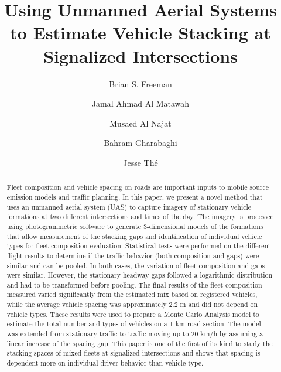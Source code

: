 \documentclass[preprint,12pt,a4paper]{elsarticle}
\title{Using Unmanned Aerial Systems to Estimate Vehicle Stacking at Signalized Intersections}
\begin{document}
\maketitle

\begin{linenumbers}
\begin{frontmatter}

\author[add1]{Brian S. Freeman }

\author[add2]{Jamal Ahmad Al Matawah}

\author[add3]{Musaed Al Najat}

\author[add1]{Bahram Gharabaghi}

\author[add1,add4]{Jesse Th\'e }


\address[add1]{School of Engineering, University of Guelph, Guelph, Ontario, N1G 2W1, Canada}
\address[add2]{Civil Engineering Department, College of Technological Studies, Public Authority for Applied Education and Training, Shuwaikh, Kuwait}
\address[add3]{Kuwait Traffic Safety Society, Shuwaikh, Kuwait}
\address[add4]{Lakes Environmental, 170 Columbia St W, Waterloo, Ontario, N2L 3L3 Canada}


\begin{abstract}
Fleet composition and vehicle spacing on roads are important inputs to mobile source emission models and traffic planning. In this paper, we present a novel method that uses an unmanned aerial system (UAS) to capture imagery of stationary vehicle formations at two different intersections and times of the day. The imagery is processed using photogrammetric software to generate 3-dimensional models of the formations that allow measurement of the stacking gaps and identification of individual vehicle types for fleet composition evaluation. Statistical tests were performed on the different flight results to determine if the traffic behavior (both composition and gaps) were similar and can be pooled. In both cases, the variation of fleet composition and gaps were similar. However, the stationary headway gaps followed a logarithmic distribution and had to be transformed before pooling. The final results of the fleet composition measured varied significantly from the estimated mix based on registered vehicles, while the average vehicle spacing was approximately 2.2 m and did not depend on vehicle types. These results were used to prepare a Monte Carlo Analysis model to estimate the total number and types of vehicles on a 1 km road section. The model was extended from stationary traffic to traffic moving up to 20 km/h by assuming a linear increase of the spacing gap. This paper is one of the first of its kind to study the stacking spaces of mixed fleets at signalized intersections and shows that spacing is dependent more on individual driver behavior than vehicle type.\\


\end{abstract}
\end{frontmatter}
\end{linenumbers}
\end{document}
